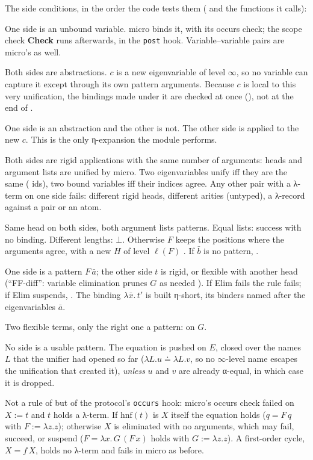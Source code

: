 The side conditions, in the order the code tests them ( and the functions it calls):
\begin{description}[style=nextline,leftmargin=5.6em]
  \item[\rulename{Var}] One side is an unbound variable. micro binds it, with its occurs check; the scope check
    \textbf{Check} runs afterwards, in the \texttt{post} hook. Variable–variable pairs are micro's as well.
  \item[\rulename{ξ}] Both sides are abstractions. $c$ is a new eigenvariable of level $\infty$, so no variable
    can capture it except through its own pattern arguments. Because $c$ is local to this very unification,
    the bindings made under it are checked at once (), not at the end of .
  \item[\rulename{η}] One side is an abstraction and the other is not. The other side is applied to the new
    $c$. This is the only η-expansion the module performs.
  \item[\rulename{Rigid}] Both sides are rigid applications with the same number of arguments: heads and
    argument lists are unified by micro. Two eigenvariables unify iff they are the same ( ids), two
    bound variables iff their indices agree. Any other pair with a λ-term on one side fails: different rigid
    heads, different arities (untyped), a λ-record against a pair or an atom.
  \item[\rulename{FF-same}] Same head on both sides, both argument lists patterns. Equal lists: success with
    no binding. Different lengths: $\bot$. Otherwise $F$ keeps the positions where the arguments agree, with a
    new $H$ of level $\ell(F)$ . If $\bar b$ is no pattern, .
  \item[\rulename{FR}] One side is a pattern $F\,\bar a$; the other side $t$ is rigid, or flexible with another
    head (\enquote{FF-diff}: variable elimination prunes $G$ as needed ). If Elim fails the rule
    fails; if Elim suspends, . The binding $\lambda\bar x.\,t'$ is built η-short, its binders
    named after the eigenvariables $\bar a$.
  \item[\rulename{FF-one}] Two flexible terms, only the right one a pattern:  on $G$.
  \item[\rulename{Delay}] No side is a usable pattern. The equation is pushed on $E$, closed over the names $L$
    that the unifier had opened so far ($\lambda L.u \doteq \lambda L.v$, so no $\infty$-level name escapes the
    unification that created it), \emph{unless} $u$ and $v$ are already α-equal, in which case it is dropped.
  \item[\rulename{Occurs}] Not a rule of  but of the protocol's \texttt{occurs} hook: micro's
    occurs check failed on $X := t$ and $t$ holds a λ-term. If $\mathrm{hnf}(t)$ is $X$ itself the equation
    holds ($q = F\,q$ with $F := \lambda z.z$); otherwise $X$ is eliminated with no arguments, which may fail,
    succeed, or suspend ($F = \lambda x.\,G\,(F\,x)$ holds with $G := \lambda z.z$). A first-order cycle,
    $X = f\,X$, holds no λ-term and fails in micro as before.
\end{description}

